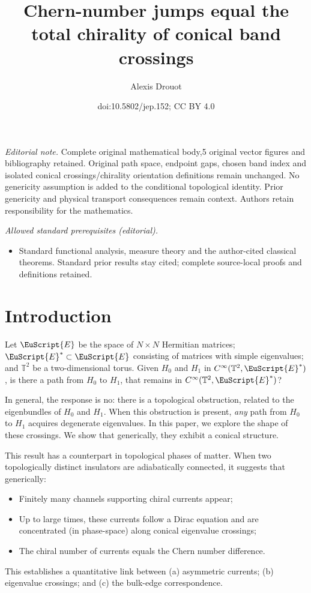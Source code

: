 \documentclass[10pt]{amsart}
\title{Chern-number jumps equal the total chirality of conical band crossings}
\author{Alexis Drouot}
\date{doi:10.5802/jep.152; CC BY 4.0}
\let\pazocal\EuScript
\theoremstyle{definition}
\newcommand{\EE}{\pazocal{E}}
\newcommand{\Tt}{{\mathbb{T}}}
\providecommand{\mainmatter}{}\providecommand{\backmatter}{}
\begin{document}
\maketitle
\noindent\textit{Editorial note.} Complete original mathematical body,5 original vector figures and bibliography retained. Original path space, endpoint gaps, chosen band index and isolated conical crossings/chirality orientation definitions remain unchanged. No genericity assumption is added to the conditional topological identity. Prior genericity and physical transport consequences remain context. Authors retain responsibility for the mathematics.\par\medskip
\noindent\textit{Allowed standard prerequisites (editorial).}\begin{itemize}
\item Standard functional analysis, measure theory and the author-cited classical theorems. Standard prior results stay cited; complete source-local proofs and definitions retained.
\end{itemize}\medskip
\vspace*{-\baselineskip}
\tableofcontents
\mainmatter
\section{Introduction}

Let $\EE$ be the space of $N \times N$ Hermitian matrices; $\EE^* \subset \EE$ consisting of matrices with simple eigenvalues; and $\Tt^2$ be a two-dimensional torus. Given $H_0$ and $H_1$ in $C^\infty(\Tt^2,\EE^*)$, is there a path from $H_0$ to $H_1$, that remains in $C^\infty(\Tt^2,\EE^*)$?

In general, the response is no: there is a topological obstruction, related to the eigenbundles of $H_0$ and $H_1$. When this obstruction is present, \textit{any} path from $H_0$ to $H_1$ acquires degenerate eigenvalues. In this paper, we explore the shape of these crossings. We show that generically, they exhibit a conical structure.

This result has a counterpart in topological phases of matter. When two topologically distinct insulators are adiabatically connected, it suggests that generically:
\begin{itemize}
\item Finitely many channels supporting chiral currents appear;
\item Up to large times, these currents follow a Dirac equation and are concentrated (in phase-space) along conical eigenvalue crossings;
\item The chiral number of currents equals the Chern number difference.
\end{itemize}
This establishes a quantitative link between (a) asymmetric currents; (b) eigenvalue crossings; and (c) the bulk-edge correspondence.
\end{document}
